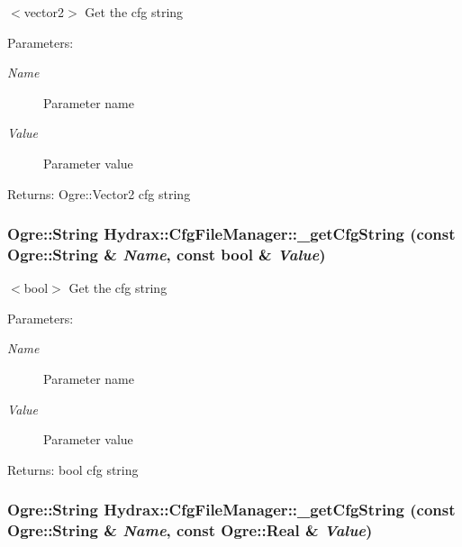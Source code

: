 $<$vector2$>$ Get the cfg string \begin{Desc}
\item[Parameters:]
\begin{description}
\item[{\em Name}]Parameter name \item[{\em Value}]Parameter value \end{description}
\end{Desc}
\begin{Desc}
\item[Returns:]Ogre::Vector2 cfg string \end{Desc}
\hypertarget{class_hydrax_1_1_cfg_file_manager_b87e26d4e678cc8daff159bf9e8c3f7d}{
\subsubsection[{\_\-getCfgString}]{\setlength{\rightskip}{0pt plus 5cm}Ogre::String Hydrax::CfgFileManager::\_\-getCfgString (const Ogre::String \& {\em Name}, \/  const bool \& {\em Value})}}
\label{class_hydrax_1_1_cfg_file_manager_b87e26d4e678cc8daff159bf9e8c3f7d}


$<$bool$>$ Get the cfg string \begin{Desc}
\item[Parameters:]
\begin{description}
\item[{\em Name}]Parameter name \item[{\em Value}]Parameter value \end{description}
\end{Desc}
\begin{Desc}
\item[Returns:]bool cfg string \end{Desc}
\hypertarget{class_hydrax_1_1_cfg_file_manager_8761a9aa82111e2d20a6beb4a3e3b5ed}{
\subsubsection[{\_\-getCfgString}]{\setlength{\rightskip}{0pt plus 5cm}Ogre::String Hydrax::CfgFileManager::\_\-getCfgString (const Ogre::String \& {\em Name}, \/  const Ogre::Real \& {\em Value})}}
\label{class_hydrax_1_1_cfg_file_manager_8761a9aa82111e2d20a6beb4a3e3b5ed}


